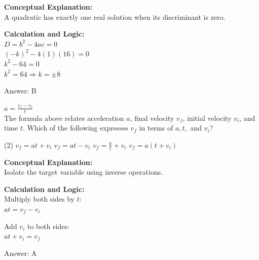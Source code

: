 \documentclass[11pt,paper=a4,answers]{exam}
\begin{document}
\begin{questions}
\begin{solution}
\textbf{Conceptual Explanation:} \\
A quadratic has exactly one real solution when its discriminant is zero.

\vspace{20pt}

\textbf{Calculation and Logic:} \\
$D = b^2 - 4ac = 0$ \\
$(-k)^2 - 4(1)(16) = 0$ \\
$k^2 - 64 = 0$ \\
$k^2 = 64 \Rightarrow k = \pm 8$

\vspace{25pt}

Answer: \colorbox{yellow!100}{B}
\end{solution}

\vspace{40pt}

\question
$a = \frac{v_f - v_i}{t}$ \\
The formula above relates acceleration $a$, final velocity $v_f$, initial velocity $v_i$, and time $t$. Which of the following expresses $v_f$ in terms of $a, t,$ and $v_i$?
\begin{tasks}(2)
    \task $v_f = at + v_i$
    \task $v_f = at - v_i$
    \task $v_f = \frac{a}{t} + v_i$
    \task $v_f = a(t + v_i)$
\end{tasks}

\begin{solution}
\textbf{Conceptual Explanation:} \\
Isolate the target variable using inverse operations.

\vspace{20pt}

\textbf{Calculation and Logic:} \\
Multiply both sides by $t$: \\
$at = v_f - v_i$

\vspace{10pt}

Add $v_i$ to both sides: \\
$at + v_i = v_f$

\vspace{25pt}

Answer: \colorbox{yellow!100}{A}
\end{solution}

\vspace{40pt}


\end{questions}
\end{document}
